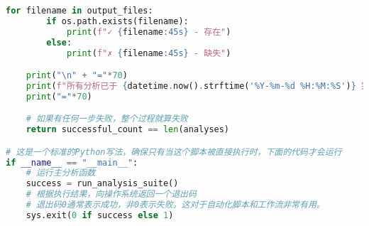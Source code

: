 \documentclass[UTF8, a4paper, 11pt]{ctexart}
\begin{document}
\begin{lstlisting}[language=Python, caption={运行完整分析流程的主脚本。}]
    for filename in output_files:
        if os.path.exists(filename):
            print(f"✓ {filename:45s} - 存在")
        else:
            print(f"✗ {filename:45s} - 缺失")

    print("\n" + "="*70)
    print(f"所有分析已于 {datetime.now().strftime('%Y-%m-%d %H:%M:%S')} 完成")
    print("="*70)

    # 如果有任何一步失败，整个过程就算失败
    return successful_count == len(analyses)

# 这是一个标准的Python写法，确保只有当这个脚本被直接执行时，下面的代码才会运行
if __name__ == "__main__":
    # 运行主分析函数
    success = run_analysis_suite()
    # 根据执行结果，向操作系统返回一个退出码
    # 退出码0通常表示成功，非0表示失败。这对于自动化脚本和工作流非常有用。
    sys.exit(0 if success else 1)
\end{lstlisting}
\end{document}
